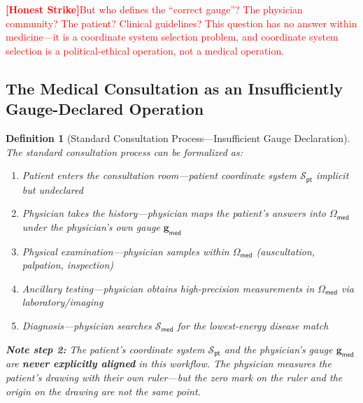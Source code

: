 \documentclass[12pt,a4paper]{article}
\newtheorem{definition}[theorem]{Definition}
\theoremstyle{remark}
\newcommand{\med}{\textsf{med}}
\newcommand{\pt}{\textsf{pt}}
\newcommand{\honestcrit}[1]{%
    \textcolor{red}{\textbf{[Honest Strike]}#1}%
}
\begin{document}
\honestcrit{But who defines the ``correct gauge''? The physician community? The patient? Clinical guidelines? This question has no answer within medicine---it is a coordinate system selection problem, and coordinate system selection is a political-ethical operation, not a medical operation.}

\subsection{The Medical Consultation as an Insufficiently Gauge-Declared Operation}

\begin{definition}[Standard Consultation Process---Insufficient Gauge Declaration]\label{def:standard_visit}
The standard consultation process can be formalized as:
\begin{enumerate}[label=(\arabic*)]
    \item Patient enters the consultation room---patient coordinate system $\mathcal{S}_{\pt}$ implicit but undeclared
    \item Physician takes the history---physician maps the patient's answers into $\Omega_{\med}$ under the physician's own gauge $\mathbf{g}_{\med}$
    \item Physical examination---physician samples within $\Omega_{\med}$ (auscultation, palpation, inspection)
    \item Ancillary testing---physician obtains high-precision measurements in $\Omega_{\med}$ via laboratory/imaging
    \item Diagnosis---physician searches $\mathcal{S}_{\med}$ for the lowest-energy disease match
\end{enumerate}

\textbf{Note step 2:} The patient's coordinate system $\mathcal{S}_{\pt}$ and the physician's gauge $\mathbf{g}_{\med}$ are \textbf{never explicitly aligned} in this workflow. The physician measures the patient's drawing with their own ruler---but the zero mark on the ruler and the origin on the drawing are not the same point.
\end{definition}
\end{document}
